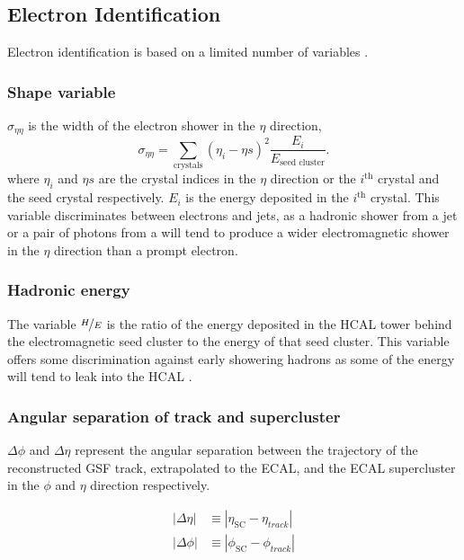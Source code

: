 \subsection{Electron Identification}
\label{sec:eid}
Electron identification is based on a limited number of variables
\cite{daskalakis2009data,baffioni2009identification}.

\subsubsection{Shape variable}

$\sigma_{\eta\eta}$ is the width of the electron shower in the $\eta$
direction,
\begin{equation}
\sigma_{\eta\eta} = 
\sum_{\text{crystals}} \left(\eta_{i} - \eta{s}\right)^{2}
\frac{E_{i}}{E_{\text{seed cluster}}}.
\end{equation}
where $\eta_{i}$ and $\eta{s}$ are the crystal indices in the $\eta$
direction or the $i^{\mathrm{th}}$ crystal and the seed crystal respectively.
$E_i$ is the energy deposited in the $i^{\mathrm{th}}$ crystal.  This variable
discriminates between electrons and jets, as a hadronic shower from a jet or a
pair of photons from a \Ppizero will tend to produce a wider electromagnetic
shower in the $\eta$ direction than a prompt electron.

\subsubsection{Hadronic energy}
The variable $\nicefrac{H}{E}$ is the ratio of the energy deposited in the HCAL
tower behind the electromagnetic seed cluster to the energy of that seed
cluster. This variable offers some discrimination against early showering
hadrons as some of the energy will tend to leak into the HCAL
\cite{baffioni2009identification}.

\subsubsection{Angular separation of track and supercluster}
$\Delta\phi$ and $\Delta\eta$ represent the angular separation between the
trajectory of the reconstructed {GSF} track, extrapolated to the ECAL, and
the ECAL supercluster in the $\phi$ and $\eta$ direction respectively.

\begin{align}
|\Delta\eta| &\equiv |\eta_{\text{SC}} - \eta_{track}|\\
|\Delta\phi| &\equiv |\phi_{\text{SC}} - \phi_{track}|
\end{align}

